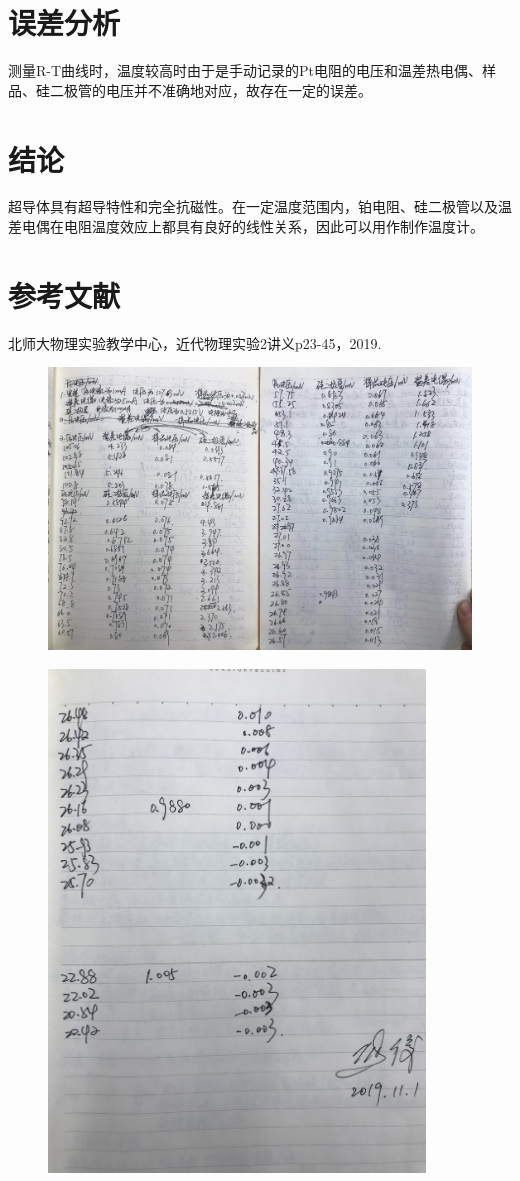 \documentclass[UTF8]{ctexart}
\begin{document}
\section{误差分析}
测量R-T曲线时，温度较高时由于是手动记录的Pt电阻的电压和温差热电偶、样品、硅二极管的电压并不准确地对应，故存在一定的误差。

\section{结论}
超导体具有超导特性和完全抗磁性。在一定温度范围内，铂电阻、硅二极管以及温差电偶在电阻温度效应上都具有良好的线性关系，因此可以用作制作温度计。

\section{参考文献}
\small
\noindent[1]北师大物理实验教学中心，近代物理实验2讲义p23-45，2019.

\newpage
\begin{figure}[H]
\includegraphics[width=15cm]{statistic1.jpg}
\end{figure}
\begin{figure}[H]
\includegraphics[width=10cm]{statistic3.jpg}
\end{figure}
\end{document}
